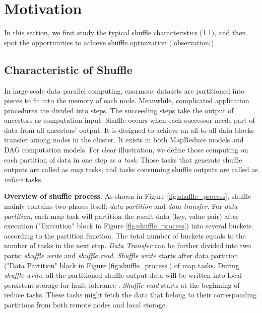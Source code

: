 \section{Motivation}

In this section, we first study the typical shuffle characteristics (\ref{shuffle pattern}), and then spot the opportunities to achieve shuffle optmization (\ref{observation})
\subsection{Characteristic of Shuffle} \label{shuffle pattern}

In large scale data parallel computing, enormous datasets are partitioned into pieces to fit into the memory of each node.
Meanwhile, complicated application procedures are divided into steps. The succeeding steps take the output of ancestors as computation input. Shuffle occurs when each successor needs 
part of data from all ancestors' output. It is designed to achieve an all-to-all data blocks transfer among nodes in the cluster. It exists in both MapReduce models and DAG computation models.
For clear illustration, we define those computing on each partition of data in one step as a \textit{task}. 
Those tasks that generate shuffle outputs are called as \textit{map} tasks, and tasks consuming shuffle outputs are called as \textit{reduce} tasks.

\textbf{Overview of shuffle process}. As shown in Figure \ref{fig:shuffle_process}, shuffle mainly contains two phases itself: \textit{data partition} and \textit{data transfer}. For \textit{data partition}, each map task will partition the result data (key, value pair) after execution ("Execution" block in Figure \ref{fig:shuffle_process}) into several buckets according to the partition function.
The total number of buckets equals to the number of tasks in the next step. 
\textit{Data Transfer} can be further divided into two parts: \textit{shuffle write} and \textit{shuffle read}. \textit{Shuffle write} starts after data partition ("Data Partition" block in Figure \ref{fig:shuffle_process}) of map tasks. 
During \textit{shuffle write}, all the partitioned shuffle output data will be written into local persistent storage for fault tolerance  \cite{mapreduce, spark}.
\textit{Shuffle read} starts at the beginning of reduce tasks. These tasks might fetch the data that belong to their corresponding partitions from both remote nodes and local storage.

